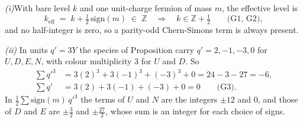 \textit{(i)}\enspace With bare level $k$ and one unit-charge fermion of mass $m$, the effective level is
\[
k_{\mathrm{eff}} \;=\; k + \tfrac{1}{2}\,\mathrm{sign}(m) \;\in\; \mathbb{Z} \quad\Longrightarrow\quad k \in \mathbb{Z} + \tfrac{1}{2} \qquad \text{(G1, G2)},
\]
and no half-integer is zero, so a parity-odd Chern-Simons term is always present.



\emph{(ii)}  In units $q' = 3Y$ the species of Proposition  carry $q' = 2, -1, -3, 0$ for $U, D, E, N$, with colour multiplicity $3$ for $U$ and $D$. So
\begin{align*}
\sum q'^{3} &= 3(2)^{3} + 3(-1)^{3} + (-3)^{3} + 0 = 24 - 3 - 27 = -6, \\
\sum q' &= 3(2) + 3(-1) + (-3) + 0 = 0 \qquad \text{(G3)}.
\end{align*}
In $\tfrac{1}{2}\sum \mathrm{sign}(m)\,q'^{3}$ the terms of $U$ and $N$ are the integers $\pm 12$ and $0$, and those of $D$ and $E$ are $\pm\tfrac{3}{2}$ and $\pm\tfrac{27}{2}$, whose sum is an integer for each choice of signs.
